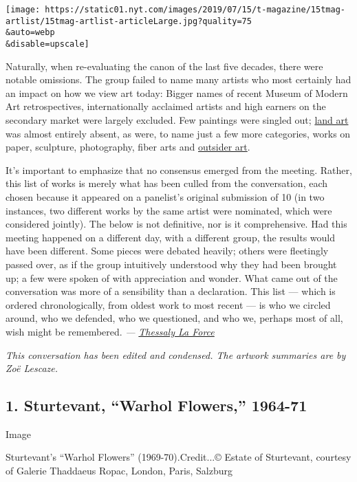 \texttt{[image: https://static01.nyt.com/images/2019/07/15/t-magazine/15tmag-artlist/15tmag-artlist-articleLarge.jpg?quality=75\\\&auto=webp\\\&disable=upscale]}

Naturally, when re-evaluating the canon of the last five decades, there
were notable omissions. The group failed to name many artists who most
certainly had an impact on how we view art today: Bigger names of recent
Museum of Modern Art retrospectives, internationally acclaimed artists
and high earners on the secondary market were largely excluded. Few
paintings were singled out;
\href{https://www.nytimes.com/2018/11/21/t-magazine/female-land-artists.html}{land
art} was almost entirely absent, as were, to name just a few more
categories, works on paper, sculpture, photography, fiber arts and
\href{https://www.nytimes.com/2015/06/01/t-magazine/outsider-art-essay-christine-smallwood.html}{outsider
art}.

It's important to emphasize that no consensus emerged from the meeting.
Rather, this list of works is merely what has been culled from the
conversation, each chosen because it appeared on a panelist's original
submission of 10 (in two instances, two different works by the same
artist were nominated, which were considered jointly). The below is not
definitive, nor is it comprehensive. Had this meeting happened on a
different day, with a different group, the results would have been
different. Some pieces were debated heavily; others were fleetingly
passed over, as if the group intuitively understood why they had been
brought up; a few were spoken of with appreciation and wonder. What came
out of the conversation was more of a sensibility than a declaration.
This list --- which is ordered chronologically, from oldest work to most
recent --- is who we circled around, who we defended, who we questioned,
and who we, perhaps most of all, wish might be remembered. \emph{---}
\href{https://www.nytimes.com/by/thessaly-la-force}{\emph{Thessaly La
Force}}

\emph{This conversation has been edited and condensed. The artwork
summaries are by Zoë Lescaze.}

\hypertarget{1-sturtevant-warhol-flowers-1964-71}{%
\subsection{1. Sturtevant, ``Warhol Flowers,''
1964-71}\label{1-sturtevant-warhol-flowers-1964-71}}

Image

Sturtevant's ``Warhol Flowers'' (1969-70).Credit...© Estate of
Sturtevant, courtesy of Galerie Thaddaeus Ropac, London, Paris, Salzburg


